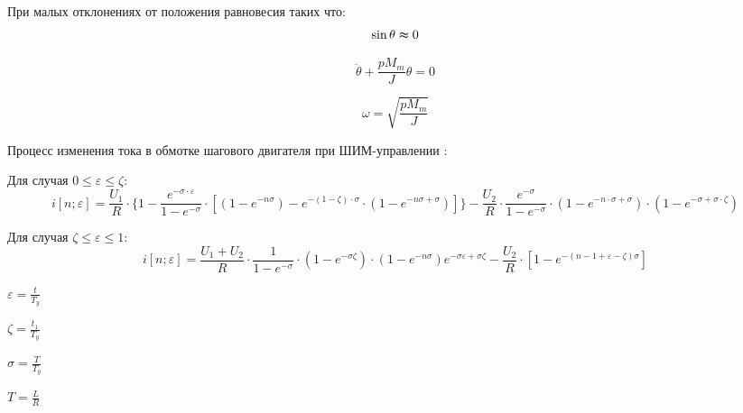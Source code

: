 При малых отклонениях от положения равновесия таких что:
\begin{equation}
    \sin{\theta} \thickapprox 0
\end{equation}

\begin{equation}
    \label{rotor_like_harmonical_oscilator_equation}
    \ddot{\theta} + \frac{p M_{m}}{J} \theta = 0
\end{equation}

\begin{equation}
    \label{friquent_for_rotor_self_oscilating}
    \omega = \sqrt{\frac{p M_{m}}{J}}
\end{equation}

Процесс изменения тока в обмотке шагового двигателя при ШИМ-управлении \cite[гл. 6.4, стр. 239]{Chilikin}:

Для случая $0 \le \varepsilon \le \zeta$:
\begin{equation}
    \label{winding_current_with_pwm_control_1}
    i[n ; \varepsilon] =
        \frac{ U_{1} }{ R }
            \cdot \{ 1
                 -\frac { e^{ -\sigma \cdot \varepsilon } }
                        { 1 - e^{-\sigma} }
                    \cdot [ (1 - e^{-n\sigma})
                              - e^{ -(1 - \zeta) \cdot \sigma }
                                    \cdot ( 1 - e^{-n\sigma + \sigma} )
                          ]
              \}
        -\frac{ U_2 }{ R }
            \cdot \frac {e^{-\sigma}} {1 - e^{-\sigma}}
            \cdot ( 1 - e^{ -n \cdot \sigma + \sigma } )
            \cdot ( 1 - e^{ -\sigma + \sigma \cdot \zeta } )
\end{equation}

Для случая $\zeta \le \varepsilon \le 1$:
\begin{equation}
    \label{winding_current_with_pwm_control_0}
    i[n; \varepsilon] =
        \frac{ U_{1} + U_{2} }{ R }
            \cdot \frac{ 1 }{ 1 - e^{-\sigma} }
            \cdot (1 - e^{-\sigma\zeta})
            \cdot (1 - e^{-n\sigma})e^{-\sigma\varepsilon + \sigma\zeta} 
        - \frac{ U_{2} }{ R }
            \cdot [ 1 - e^{ -( n - 1 + \varepsilon - \zeta ) \sigma }]

\end{equation}

$\varepsilon = \frac{ t }{ T_{y} }$

$\zeta = \frac{ t_{1} }{ T_{y} }$

$\sigma = \frac{ T }{ T_{y} }$

$T = \frac{ L }{ R }$


